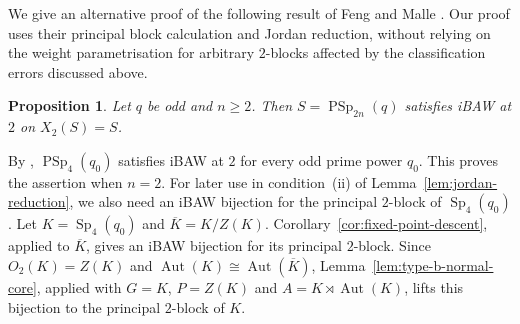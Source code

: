 \documentclass[10pt]{amsart}
\newtheorem{proposition}[theorem]{Proposition}
\theoremstyle{definition}
\renewcommand{\geq}{\geqslant}
\let\oldendproof\endproof
\renewenvironment{proof}[1][\proofname]{%
  \oldproof[\bfseries #1]%
}{\oldendproof}
\DeclareMathOperator{\Aut}{Aut}
\DeclareMathOperator{\Sp}{Sp}
\DeclareMathOperator{\PSp}{PSp}
\numberwithin{equation}{section}
\numberwithin{table}{section}
\begin{document}
We give an alternative proof of the following result of Feng and Malle
\cite[Theorem~1]{FengMalle2022}.  Our proof uses their principal block
calculation and Jordan reduction, without relying on the weight
parametrisation for arbitrary $2$-blocks affected by the classification
errors discussed above.

\begin{proposition}\label{prop:odd-two}
Let $q$ be odd and $n\geq2$.  Then
$S=\PSp_{2n}(q)$ satisfies iBAW at $2$ on $X_2(S)=S$.
\end{proposition}

\begin{proof}
By \cite[Theorem~1.1]{LiLi2019}, $\PSp_4(q_0)$ satisfies iBAW
at $2$ for every odd prime power $q_0$. This proves the assertion
when $n=2$. For later use in condition~\textup{(ii)} of
Lemma~\ref{lem:jordan-reduction}, we also need an iBAW bijection
for the principal $2$-block of $\Sp_4(q_0)$.
Let $K=\Sp_4(q_0)$ and $\overline K=K/Z(K)$.
Corollary~\ref{cor:fixed-point-descent}, applied to $\overline K$,
gives an iBAW bijection for its principal $2$-block.
Since $O_2(K)=Z(K)$ and $\Aut(K)\cong\Aut(\overline K)$,
Lemma~\ref{lem:type-b-normal-core}, applied with $G=K$,
$P=Z(K)$ and $A=K\rtimes\Aut(K)$, lifts this bijection to the
principal $2$-block of $K$.


\end{proof}
\end{document}
